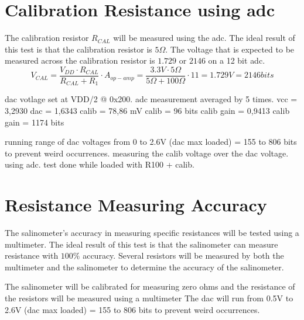\section{Calibration Resistance using \gls{adc}}\label{sec:calibration-resistance-using-adc}

The calibration resistor $R_{CAL}$ will be measured using the \gls{adc}.
The ideal result of this test is that the calibration resistor is $5\Omega$.
The voltage that is expected to be measured across the calibration resistor is $1.729$ or $2146$ on a 12 bit \gls{adc}.
\begin{equation}
    V_{CAL} = \frac{V_{DD} \cdot R_{CAL}}{R_{CAL} + R_1} \cdot A_{op-amp} = \frac{3.3V \cdot 5\Omega}{5\Omega + 100\Omega} \cdot 11 = 1.729V = 2146 bits
\end{equation}

dac votlage set at VDD/2 @ 0x200. adc measurement averaged by 5 times.
vcc = 3,2930
dac = 1,6343
calib = 78,86 mV
calib = 96 bits
calib gain = 0,9413
calib gain = 1174 bits

running range of dac voltages from 0 to 2.6V (dac max loaded) = 155 to 806 bits to prevent weird occurrences.
measuring the calib voltage over the dac voltage. using adc.
test done while loaded with R100 + calib.


\section{Resistance Measuring Accuracy}\label{sec:resistance-measuring-accuracy}

The salinometer's accuracy in measuring specific resistances will be tested using a multimeter.
The ideal result of this test is that the salinometer can measure resistance with $100\%$ accuracy.
Several resistors will be measured by both the multimeter and the salinometer to determine the accuracy of the salinometer.

The salinometer will be calibrated for measuring zero ohms and the resistance of the resistors will be measured using a multimeter
The dac will run from 0.5V to 2.6V  (dac max loaded) = 155 to 806 bits to prevent weird occurrences. 